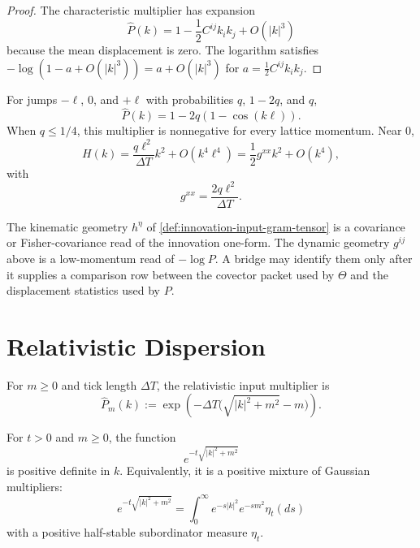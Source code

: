 \begin{proof}
The characteristic multiplier has expansion
$$
\widehat P(k)=1-\frac12C^{ij}k_ik_j+O(|k|^3)
$$
because the mean displacement is zero. The logarithm satisfies
$-\log(1-a+O(|k|^3))=a+O(|k|^3)$ for
$a=\frac12C^{ij}k_ik_j$.
\end{proof}

\begin{example}
\label{ex:innovation-input-dynamics-one-dimensional-local-chain}
For jumps $-\ell$, $0$, and $+\ell$ with probabilities $q$, $1-2q$, and
$q$,
$$
\widehat P(k)=1-2q(1-\cos(k\ell)).
$$
When $q\le1/4$, this multiplier is nonnegative for every lattice momentum.
Near $0$,
$$
H(k)=\frac{q\ell^2}{\Delta T}k^2+O(k^4\ell^4)
=
\frac12g^{xx}k^2+O(k^4),
$$
with
$$
g^{xx}=\frac{2q\ell^2}{\Delta T}.
$$
\end{example}

\begin{principle}
\label{prin:innovation-input-dynamics-two-geometries}
The kinematic geometry $h^\eta$ of
\autoref{def:innovation-input-gram-tensor} is a covariance or
Fisher-covariance read of the innovation one-form. The dynamic geometry
$g^{ij}$ above is a low-momentum read of $-\log P$. A bridge may identify
them only after it supplies a comparison row between the covector packet
used by $\Theta$ and the displacement statistics used by $P$.
\end{principle}

\section{Relativistic Dispersion}
\label{sec:innovation-input-dynamics-relativistic-dispersion}

\begin{definition}
\label{def:innovation-input-dynamics-relativistic-multiplier}
For $m\ge0$ and tick length $\Delta T$, the relativistic input multiplier is
$$
\widehat P_m(k)
:=
\exp\left(
-\Delta T\bigl(\sqrt{|k|^2+m^2}-m\bigr)
\right).
$$
\end{definition}

\begin{lemma}
\label{lem:innovation-input-dynamics-subordination-positivity}
For $t>0$ and $m\ge0$, the function
$$
e^{-t\sqrt{|k|^2+m^2}}
$$
is positive definite in $k$. Equivalently, it is a positive mixture of
Gaussian multipliers:
$$
e^{-t\sqrt{|k|^2+m^2}}
=
\int_0^\infty
e^{-s|k|^2}e^{-sm^2}\eta_t(ds)
$$
with a positive half-stable subordinator measure $\eta_t$.
\end{lemma}

